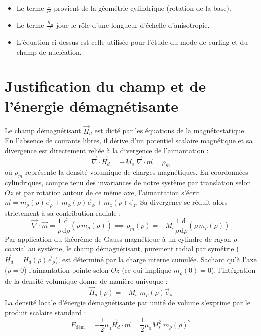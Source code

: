 \documentclass[11pt,a4paper]{article}
\begin{document}
\begin{itemize}

\item Le terme $\frac{1}{r^2}$ provient de la géométrie cylindrique (rotation de la base).

\item Le terme $\frac{K_u}{A}$ joue le rôle d'une longueur d'échelle d'anisotropie.

\item L'équation ci-dessus est celle utilisée pour l'étude du mode de curling et du champ de nucléation.

\end{itemize}

\section*{Justification du champ et de l'énergie démagnétisante}

Le champ démagnétisant $\vec{H}_d$ est dicté par les équations de la magnétostatique. En l'absence de courants libres, il dérive d'un potentiel scalaire magnétique et sa divergence est directement reliée à la divergence de l'aimantation :
\begin{equation}
    \vec{\nabla} \cdot \vec{H}_d = -M_s\; \vec{\nabla} \cdot \vec{m} = \rho_m
\end{equation}
où $\rho_m$ représente la densité volumique de charges magnétiques. En coordonnées cylindriques, compte tenu des invariances de notre système par translation selon $Oz$ et par rotation autour de ce même axe, l'aimantation s'écrit $\vec{m} = m_\rho(\rho)\vec{e}_\rho + m_\phi(\rho)\vec{e}_\phi + m_z(\rho)\vec{e}_z$. Sa divergence se réduit alors strictement à sa contribution radiale :
\begin{equation}
    \vec{\nabla} \cdot \vec{m} = \frac{1}{\rho} \frac{\text{d}}{\text{d}\rho} \left(\rho \, m_\rho(\rho)\right) \implies \rho_m(\rho) = -M_s\frac{1}{\rho} \frac{\text{d}}{\text{d}\rho} \left(\rho \, m_\rho(\rho)\right)
\end{equation}
Par application du théorème de Gauss magnétique à un cylindre de rayon $\rho$ coaxial au système, le champ démagnétisant, purement radial par symétrie ($\vec{H}_d = H_d(\rho)\vec{e}_\rho$), est déterminé par la charge interne cumulée. Sachant qu'à l'axe ($\rho=0$) l'aimantation pointe selon $Oz$ (ce qui implique $m_\rho(0)=0$), l'intégration de la densité volumique donne de manière univoque :
\begin{equation}
    \vec{H}_d(\rho) = -M_s \; m_\rho(\rho)\vec{e}_\rho
\end{equation}
La densité locale d'énergie démagnétisante par unité de volume s'exprime par le produit scalaire standard :
\begin{equation}
    E_{\text{dém}} = -\frac{1}{2}\mu_0 \vec{H}_d \cdot \vec{m} = \frac{1}{2}\mu_0 M_s^2 \; m_\rho(\rho)^2
\end{equation}
\end{document}
